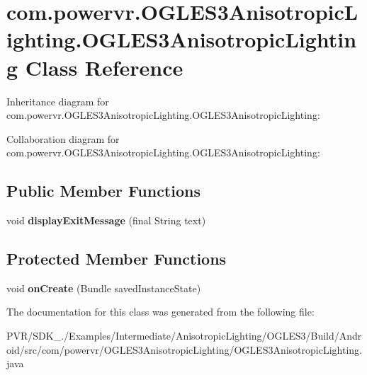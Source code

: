 \hypertarget{classcom_1_1powervr_1_1_o_g_l_e_s3_anisotropic_lighting_1_1_o_g_l_e_s3_anisotropic_lighting}{\section{com.\+powervr.\+O\+G\+L\+E\+S3\+Anisotropic\+Lighting.\+O\+G\+L\+E\+S3\+Anisotropic\+Lighting Class Reference}
\label{classcom_1_1powervr_1_1_o_g_l_e_s3_anisotropic_lighting_1_1_o_g_l_e_s3_anisotropic_lighting}
}


Inheritance diagram for com.\+powervr.\+O\+G\+L\+E\+S3\+Anisotropic\+Lighting.\+O\+G\+L\+E\+S3\+Anisotropic\+Lighting\+:


Collaboration diagram for com.\+powervr.\+O\+G\+L\+E\+S3\+Anisotropic\+Lighting.\+O\+G\+L\+E\+S3\+Anisotropic\+Lighting\+:
\subsection*{Public Member Functions}
\begin{DoxyCompactItemize}
\item 
\hypertarget{classcom_1_1powervr_1_1_o_g_l_e_s3_anisotropic_lighting_1_1_o_g_l_e_s3_anisotropic_lighting_a1ef99146b3c8521d3aa6e236cddd355b}{void {\bfseries display\+Exit\+Message} (final String text)}\label{classcom_1_1powervr_1_1_o_g_l_e_s3_anisotropic_lighting_1_1_o_g_l_e_s3_anisotropic_lighting_a1ef99146b3c8521d3aa6e236cddd355b}

\end{DoxyCompactItemize}
\subsection*{Protected Member Functions}
\begin{DoxyCompactItemize}
\item 
\hypertarget{classcom_1_1powervr_1_1_o_g_l_e_s3_anisotropic_lighting_1_1_o_g_l_e_s3_anisotropic_lighting_a38c614306ee50c310036fbeadcb41ecc}{void {\bfseries on\+Create} (Bundle saved\+Instance\+State)}\label{classcom_1_1powervr_1_1_o_g_l_e_s3_anisotropic_lighting_1_1_o_g_l_e_s3_anisotropic_lighting_a38c614306ee50c310036fbeadcb41ecc}

\end{DoxyCompactItemize}


The documentation for this class was generated from the following file\+:\begin{DoxyCompactItemize}
\item 
P\+V\+R/\+S\+D\+K\+\_./\+Examples/\+Intermediate/\+Anisotropic\+Lighting/\+O\+G\+L\+E\+S3/\+Build/\+Android/src/com/powervr/\+O\+G\+L\+E\+S3\+Anisotropic\+Lighting/O\+G\+L\+E\+S3\+Anisotropic\+Lighting.\+java\end{DoxyCompactItemize}
